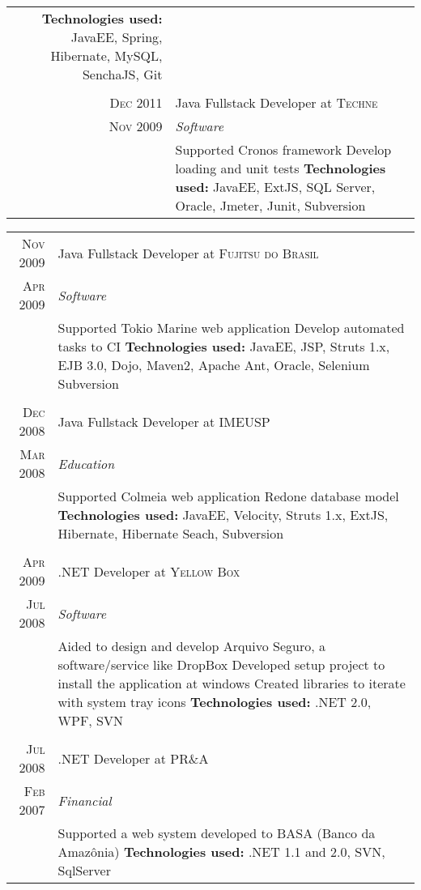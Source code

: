 \documentclass[a4paper,10pt]{article}
\begin{document}
\begin{tabular}{r|p{11cm}}
{\textbf{Technologies used:} JavaEE, Spring, Hibernate, MySQL, SenchaJS, Git
 }\\\multicolumn{2}{c}{} \\
\textsc{Dec 2011} & Java Fullstack Developer at \textsc{Techne} \\\textsc{Nov 2009}&\emph{Software}\\&\footnotesize{  Supported Cronos framework\newline
                          Develop loading and unit tests \newline
\textbf{Technologies used:} JavaEE, ExtJS, SQL Server, Oracle, Jmeter, Junit, Subversion
 }

 
 \end{tabular}
 \newpage
\begin{tabular}{r|p{11cm}}
\textsc{Nov 2009} & Java Fullstack Developer at \textsc{Fujitsu do Brasil}\\
\textsc{Apr 2009}&\emph{Software}\\&\footnotesize{  Supported Tokio Marine web application\newline
                          Develop automated tasks to CI \newline
\textbf{Technologies used:} JavaEE, JSP, Struts 1.x, EJB 3.0, Dojo, Maven2, Apache Ant, Oracle, Selenium Subversion
 }\\\multicolumn{2}{c}{} \\ 
 \textsc{Dec 2008} & Java Fullstack Developer at \textsc{IMEUSP} \\\textsc{Mar 2008} &\emph{Education}\\&\footnotesize{ Supported Colmeia web application\newline
                          Redone database model\newline
\textbf{Technologies used:} JavaEE, Velocity, Struts 1.x, ExtJS, Hibernate, Hibernate Seach, Subversion
 }\\\multicolumn{2}{c}{} \\
 
\textsc{Apr 2009} & .NET Developer at \textsc{Yellow Box}\\
\textsc{Jul 2008}&\emph{Software}\\&\footnotesize{ Aided to design and develop Arquivo Seguro, a software/service like DropBox\newline
   Developed setup project to install the application at windows\newline
   Created libraries to iterate with system tray icons\newline
\textbf{Technologies used:} .NET 2.0, WPF, SVN
 }\\\multicolumn{2}{c}{} \\
 \textsc{Jul 2008} & .NET Developer at \textsc{PR\&A} \\\textsc{Feb 2007}&\emph{Financial}\\&\footnotesize{  Supported a web system developed to BASA (Banco da Amazônia) \newline
\textbf{Technologies used:} .NET 1.1 and 2.0, SVN, SqlServer
 }
\end{tabular}
\end{document}
